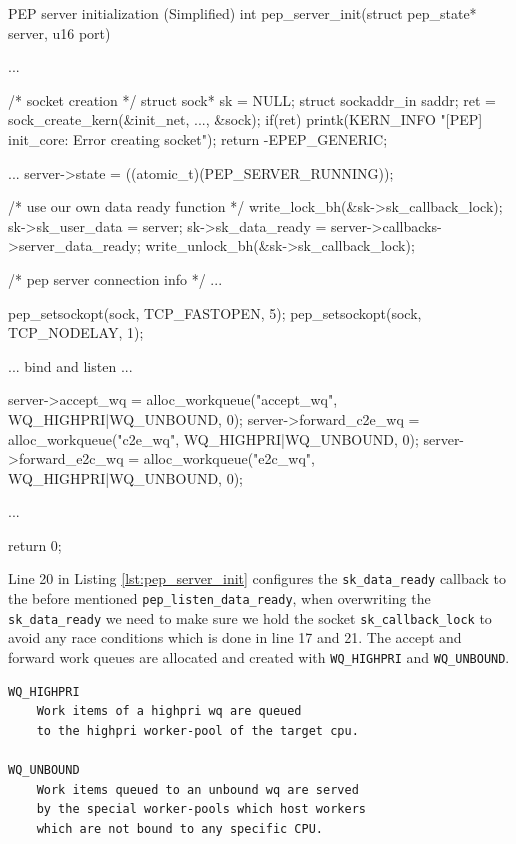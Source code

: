 \documentclass[a4paper,english, 11pt]{report}
\begin{document}
\begin{autonumlstlisting}[label=lst:pep_server_init]{PEP server initialization (Simplified)}
int pep_server_init(struct pep_state* server, u16 port)
{
	...

	/* socket creation */
	struct sock* sk = NULL;
	struct sockaddr_in saddr;
	ret = sock_create_kern(&init_net, ..., &sock);
	if(ret){
			printk(KERN_INFO "[PEP] init_core: Error creating socket\n");
			return -EPEP_GENERIC;
	}

	...
	server->state = ((atomic_t){(PEP_SERVER_RUNNING)});
	
	/* use our own data ready function */
	write_lock_bh(&sk->sk_callback_lock);
	sk->sk_user_data = server;
	sk->sk_data_ready = server->callbacks->server_data_ready;
	write_unlock_bh(&sk->sk_callback_lock);

	/* pep server connection info */
	...

	pep_setsockopt(sock, TCP_FASTOPEN, 5);
	pep_setsockopt(sock, TCP_NODELAY, 1);
	
	... bind and listen ...

	server->accept_wq = alloc_workqueue("accept_wq", WQ_HIGHPRI|WQ_UNBOUND, 0);
	server->forward_c2e_wq = alloc_workqueue("c2e_wq", WQ_HIGHPRI|WQ_UNBOUND, 0);
	server->forward_e2c_wq = alloc_workqueue("e2c_wq", WQ_HIGHPRI|WQ_UNBOUND, 0);

	...

	return 0;
}
\end{autonumlstlisting}

Line 20 in Listing \ref{lst:pep_server_init} configures the \verb|sk_data_ready| callback to the before mentioned \verb|pep_listen_data_ready|, when overwriting the \verb|sk_data_ready| we need to make sure we hold the socket \verb|sk_callback_lock| to avoid any race conditions which is done in line 17 and 21. The accept and forward work queues are allocated and created with \verb|WQ_HIGHPRI| and \verb|WQ_UNBOUND|.\\

\noindent\begin{minipage}{\linewidth}
\begin{verbatim}
WQ_HIGHPRI
    Work items of a highpri wq are queued
    to the highpri worker-pool of the target cpu.

WQ_UNBOUND
    Work items queued to an unbound wq are served
    by the special worker-pools which host workers
    which are not bound to any specific CPU.
\end{verbatim}
\end{minipage}\\
\end{document}
